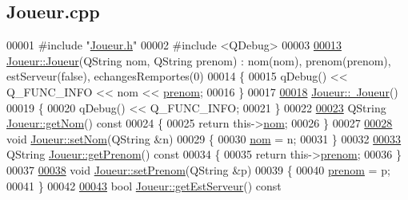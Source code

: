 \hypertarget{_joueur_8cpp_source}{}\subsection{Joueur.\+cpp}

\begin{DoxyCode}
00001 \textcolor{preprocessor}{#include "\hyperlink{_joueur_8h}{Joueur.h}"}
00002 \textcolor{preprocessor}{#include <QDebug>}
00003 
\hyperlink{class_joueur_a75f73a73741b0faa59c75fc98b872765}{00013} \hyperlink{class_joueur_a75f73a73741b0faa59c75fc98b872765}{Joueur::Joueur}(QString nom, QString prenom) : nom(nom), prenom(prenom), estServeur(false), 
      echangesRemportes(0)
00014 \{
00015     qDebug() << Q\_FUNC\_INFO << nom << \hyperlink{class_joueur_a96d4237143c2e57b8025c4e116e95909}{prenom};
00016 \}
00017 
\hyperlink{class_joueur_a9fb594f755601ee77ce5884c4c0861f3}{00018} \hyperlink{class_joueur_a9fb594f755601ee77ce5884c4c0861f3}{Joueur::~Joueur}()
00019 \{
00020     qDebug() << Q\_FUNC\_INFO;
00021 \}
00022 
\hyperlink{class_joueur_a1d7082ab1f926eae1bd6834e901751a7}{00023} QString \hyperlink{class_joueur_a1d7082ab1f926eae1bd6834e901751a7}{Joueur::getNom}()\textcolor{keyword}{ const}
00024 \textcolor{keyword}{}\{
00025     \textcolor{keywordflow}{return} this->\hyperlink{class_joueur_ab06d7f1e6b482299bb03919e0cd2166d}{nom};
00026 \}
00027 
\hyperlink{class_joueur_a30fdb194cbf6d7c378d173cc133fc23e}{00028} \textcolor{keywordtype}{void} \hyperlink{class_joueur_a30fdb194cbf6d7c378d173cc133fc23e}{Joueur::setNom}(QString &n)
00029 \{
00030     \hyperlink{class_joueur_ab06d7f1e6b482299bb03919e0cd2166d}{nom} = n;
00031 \}
00032 
\hyperlink{class_joueur_ade527085b285ce86ea9e369bc9959032}{00033} QString \hyperlink{class_joueur_ade527085b285ce86ea9e369bc9959032}{Joueur::getPrenom}()\textcolor{keyword}{ const}
00034 \textcolor{keyword}{}\{
00035     \textcolor{keywordflow}{return} this->\hyperlink{class_joueur_a96d4237143c2e57b8025c4e116e95909}{prenom};
00036 \}
00037 
\hyperlink{class_joueur_a1425ea57a1f030a26d9beb1244e6caa2}{00038} \textcolor{keywordtype}{void} \hyperlink{class_joueur_a1425ea57a1f030a26d9beb1244e6caa2}{Joueur::setPrenom}(QString &p)
00039 \{
00040     \hyperlink{class_joueur_a96d4237143c2e57b8025c4e116e95909}{prenom} = p;
00041 \}
00042 
\hyperlink{class_joueur_a7bf0e45b6600ae3a68b4afdad6d884b7}{00043} \textcolor{keywordtype}{bool} \hyperlink{class_joueur_a7bf0e45b6600ae3a68b4afdad6d884b7}{Joueur::getEstServeur}()\textcolor{keyword}{ const}

\end{DoxyCode}
